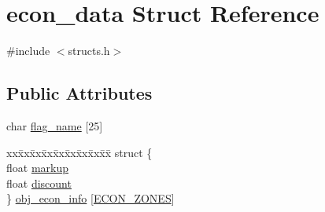\hypertarget{structecon__data}{\section{econ\-\_\-data Struct Reference}
\label{structecon__data}
}


{\ttfamily \#include $<$structs.\-h$>$}

\subsection*{Public Attributes}
\begin{DoxyCompactItemize}
\item 
char \hyperlink{structecon__data_a93b46daea7a0f663d7bff100cd4362ce}{flag\-\_\-name} \mbox{[}25\mbox{]}
\item 
\begin{tabbing}
xx\=xx\=xx\=xx\=xx\=xx\=xx\=xx\=xx\=\kill
struct \{\\
\>float \hyperlink{structecon__data_afdedf229eaa7dda94268e6a94bfec5d6}{markup}\\
\>float \hyperlink{structecon__data_a29673213b23a1dbccf6ac297c7a97b5c}{discount}\\
\} \hyperlink{structecon__data_ab53a2117ed208c348e1dd0e1b9ba009d}{obj\_econ\_info} \mbox{[}\hyperlink{structs_8h_ad96ff6bb0be116d3d884cfa94bfaf49c}{ECON\_ZONES}\mbox{]}\\

\end{tabbing}\end{DoxyCompactItemize}


